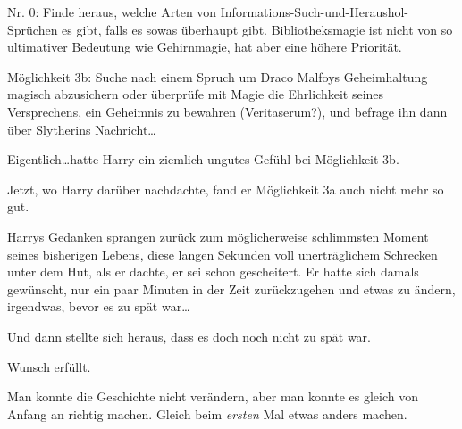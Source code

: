 \begin{em}
Nr. 0: Finde heraus, welche Arten von Informations-Such-und-Heraushol-Sprüchen es gibt, falls es sowas überhaupt gibt. Bibliotheksmagie ist nicht von so ultimativer Bedeutung wie Gehirnmagie, hat aber eine höhere Priorität.

Möglichkeit 3b: Suche nach einem Spruch um Draco Malfoys Geheimhaltung magisch abzusichern oder überprüfe mit Magie die Ehrlichkeit seines Versprechens, ein Geheimnis zu bewahren (Veritaserum?), und befrage ihn dann über Slytherins Nachricht…
\end{em}

Eigentlich…hatte Harry ein ziemlich ungutes Gefühl bei Möglichkeit 3b.

Jetzt, wo Harry darüber nachdachte, fand er Möglichkeit 3a auch nicht mehr so gut.

Harrys Gedanken sprangen zurück zum möglicherweise schlimmsten Moment seines bisherigen Lebens, diese langen Sekunden voll unerträglichem Schrecken unter dem Hut, als er dachte, er sei schon gescheitert. Er hatte sich damals gewünscht, nur ein paar Minuten in der Zeit zurückzugehen und etwas zu ändern, irgendwas, bevor es zu spät war…

Und dann stellte sich heraus, dass es doch noch nicht zu spät war.

Wunsch erfüllt.

Man konnte die Geschichte nicht verändern, aber man konnte es gleich von Anfang an richtig machen. Gleich beim \emph{ersten} Mal etwas anders machen.

